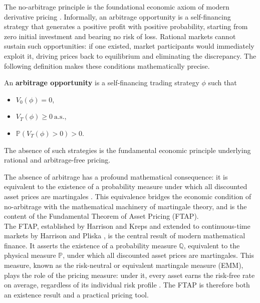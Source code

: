     \noindent
    The no-arbitrage principle is the foundational economic axiom of modern derivative pricing \cite{brigo2001interest}. Informally, an arbitrage opportunity is a self-financing strategy that generates a positive profit with positive probability, starting from zero initial investment and bearing no risk of loss. Rational markets cannot sustain such opportunities: if one existed, market participants would immediately exploit it, driving prices back to equilibrium and eliminating the discrepancy. The following definition makes these conditions mathematically precise.

    \begin{definition}\label{def:arbitrage}
        An \textbf{arbitrage opportunity} is a self-financing trading strategy $\phi$ such that
        \begin{itemize}
            \item $V_0(\phi) = 0$,
            \item $V_T(\phi) \ge 0 \ \text{a.s.}$,
            \item $\mathbb{P}\!\left( V_T(\phi) > 0 \right) > 0$.
        \end{itemize}
        The absence of such strategies is the fundamental economic principle underlying rational and arbitrage-free pricing.
    \end{definition}

    \noindent
    The absence of arbitrage has a profound mathematical consequence: it is equivalent to the existence of a probability measure under which all discounted asset prices are martingales \cite{harrison1979martingales}. This equivalence bridges the economic condition of no-arbitrage with the mathematical machinery of martingale theory, and is the content of the Fundamental Theorem of Asset Pricing (FTAP).\\

    \noindent
    The FTAP, established by Harrison and Kreps \cite{harrison1979martingales} and extended to continuous-time markets by Harrison and Pliska \cite{harrison1981martingales}, is the central result of modern mathematical finance. It asserts the existence of a probability measure $\mathbb{Q}$, equivalent to the physical measure $\mathbb{P}$, under which all discounted asset prices are martingales. This measure, known as the risk-neutral or equivalent martingale measure (EMM), plays the role of the pricing measure: under it, every asset earns the risk-free rate on average, regardless of its individual risk profile \cite{shreve2004stochastic}. The FTAP is therefore both an existence result and a practical pricing tool.\\

